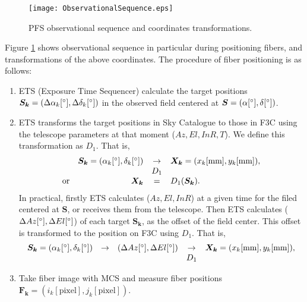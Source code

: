 \begin{figure}[!ht]
\begin{center}
\texttt{[image: ObservationalSequence.eps]}
\end{center}
\caption{PFS observational sequence and coordinates transformations.
}
\label{fig:obssec}
\end{figure}

Figure \ref{fig:obssec} shows observational sequence in particular during positioning fibers, and transformations of the above coordinates.
The procedure of fiber positioning is as follows:
\begin{enumerate}
\item ETS (Exposure Time Sequencer) calculate the target positions $\bm{S_k}=(\Delta \alpha _k [ ^\circ ], \Delta \delta _k [ ^\circ ])$ in the observed field centered at $\bm{S}=(\alpha [ ^\circ ], \delta [ ^\circ ])$.
\item ETS transforms the target positions in Sky Catalogue to those in F3C using the telescope parameters at that moment ($Az, El, InR, T$).
We define this transformation as $D_1$.
That is,
\begin{equation}
\begin{array}{crcl}
& \bm{S_k}=(\alpha _k [ ^\circ ], \delta _k [ ^\circ ]) & \rightarrow & \bm{X_k}=(x_k [ \mathrm{mm} ], y_k [ \mathrm{mm} ]), \\
& & D_1 & \\
\mathrm{or} & \bm{X_k} &= & D_1(\bm{S_k}).
\end{array}
\end{equation}
In practical, firstly ETS calculates ($Az, El, InR$) at a given time for the filed centered at $\bm{S}$, or receives them from the telescope.
Then ETS calculates ($\Delta Az [ ^\circ ], \Delta El [ ^\circ ]$) of each target $\bm{S_k}$, as the offset of the field center.
This offset is transformed to the position on F3C using $D_1$.
That is,
\begin{equation}
\begin{array}{rcccl}
\bm{S_k}=(\alpha _k [ ^\circ ], \delta _k [ ^\circ ]) & \rightarrow & (\Delta Az [ ^\circ ], \Delta El [ ^\circ ]) & \rightarrow & \bm{X_k}=(x_k [ \mathrm{mm} ], y_k [ \mathrm{mm} ]), \\
& & & D_1 & \\
\end{array}
\end{equation}
\item\label{item:mcs2f3c} Take fiber image with MCS and measure fiber positions $\bm{F_k}=(i_k [ \mathrm{pixel} ], j_k [ \mathrm{pixel} ])$.

\end{enumerate}
